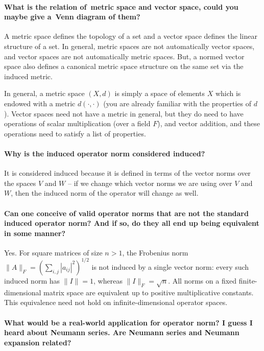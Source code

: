 \documentclass[10pt,english]{article}
\begin{document}
\paragraph{What is the relation of metric space and vector space, could you maybe give a Venn diagram of them?}
A metric space defines the topology of a set and a vector space defines the linear structure of a set.
In general, metric spaces are not automatically vector spaces, and vector spaces are not automatically metric spaces.
But, a normed vector space also defines a canonical metric space structure on the same set via the induced metric.

In general, a metric space $(X,d)$ is simply a space of elements $X$ which is endowed with a metric $d(\cdot,\cdot)$ (you are already familiar with the properties of $d$).  Vector spaces need not have a metric in general, but they do need to have operations of scalar multiplication (over a field $F$), and vector addition, and these operations need to satisfy a list of properties.

\paragraph{Why is the induced operator norm considered induced?}
It is considered induced because it is defined in terms of the vector norms over the spaces $V$ and $W$ -- if we change which vector norms we are using over $V$ and $W$, then the induced norm of the operator will change as well.


\paragraph{Can one conceive of valid operator norms that are not the standard induced operator norm? And if so, do they all end up being equivalent in some manner?}

Yes. For square matrices of size $n>1$, the Frobenius norm $\|A\|_F=(\sum_{i,j}|a_{ij}|^2)^{1/2}$ is not induced by a single vector norm: every such induced norm has $\|I\|=1$, whereas $\|I\|_F=\sqrt{n}$.
All norms on a fixed finite-dimensional matrix space are equivalent up to positive multiplicative constants.
This equivalence need not hold on infinite-dimensional operator spaces.

\paragraph{What would be a real-world application for operator norm? I guess I heard about Neumann series. Are Neumann series and Neumann expansion related?}
\end{document}
